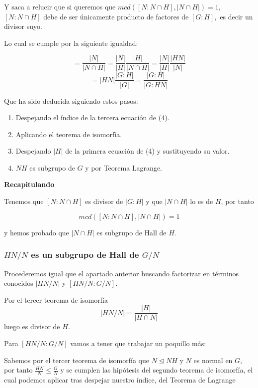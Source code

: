 \documentclass[12pt]{article}
\begin{document}
Y saca a relucir que si queremos que $mcd([N: N \cap H] ,|N\cap H|) = 1$,
$[N: N \cap H]$ debe de ser únicamente producto de factores de $[G:H],$ es decir un divisor suyo.

Lo cual se cumple por la siguiente igualdad:

\begin{equation}
    [N: N \cap H] = \frac{|N|}{|N\cap H|} = \frac{|N|}{|H|}\frac{|H|}{|N\cap H|}  
    =  \frac{|N|}{|H|}\frac{|HN|}{|N|} 
\end{equation}
\begin{equation*}
    = |HN| \frac{|G:H|}{|G|} = \frac{|G:H|}{|G:HN|} 
\end{equation*}

Que ha sido deducida siguiendo estos pasos:
\begin{enumerate}
    \item Despejando el índice de la tercera ecuación de (4).
    \item Aplicando el teorema de isomorfía.
    \item Despejando $|H|$ de la primera ecuación de (4) y 
sustituyendo su valor.
    \item $NH$ es subgrupo de $G$ y por Teorema Lagrange.
\end{enumerate}

\textbf{Recapitulando}

Tenemos que  $[N: N \cap H]$ es divisor de $|G:H|$ y que
$|N\cap H|$ lo es de $H$, por tanto 

$$mcd([N: N \cap H] ,|N\cap H|) = 1$$

y hemos probado que $|N\cap H|$ es subgrupo de Hall de $H.$

\subsubsection*{$HN/N$ es un subgrupo de Hall de $G/N$}

Procederemos igual que el apartado anterior buscando factorizar en términos conocidos
$|HN/N|$ y $[HN/N : G/N].$

Por el tercer teorema de isomorfía
$$|HN/N| = \frac{|H|}{|H \cap N|}$$ luego es divisor de $H.$


Para $[HN/N : G/N]$ vamos a tener que trabajar un poquillo más: 

Sabemos por el tercer teorema de isomorfía que  $N \trianglelefteq NH$ y $N$ es normal en $G,$
por tanto $\frac{HN}{N} \leq \frac{G}{N}$ y se cumplen 
las hipótesis del segundo teorema de isomorfía, el cual
podemos aplicar tras despejar nuestro índice, del Teorema de Lagrange 
\end{document}
